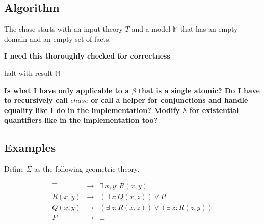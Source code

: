 	\subsection{Algorithm}
	\label{sec:chase.algorithm}

		The chase starts with an input theory $T$ and a model $\mathbb{M}$ that
		has an empty domain and an empty set of facts.

		\textbf{ I need this thoroughly checked for correctness }

		\begin{algorithm}[H]
		\DontPrintSemicolon
		halt with result $\mathbb{M}$ \;
		\end{algorithm}

		\textbf{Is what I have only applicable to a $\beta$ that is a single
		atomic? Do I have to recursively call $chase$ or call a helper for
		conjunctions and handle equality like I do in the implementation?
		Modify $\lambda$ for existential quantifiers like in the implementation
		too?}

	\subsection{Examples}

		Define $\Sigma$ as the following geometric theory.

		\begin{eqnarray}
			\label{eqn:chase1}
			\top    &  \to  &  \exists\ x,y : R(x,y)                             \\
			\label{eqn:chase2}
			R(x,y)  &  \to  &  (\exists\ z : Q(x,z)) \vee P                      \\
			\label{eqn:chase3}
			Q(x,y)  &  \to  &  (\exists\ z : R(x,z)) \vee (\exists\ z : R(z,y))  \\
			\label{eqn:chase4}
			P       &  \to  &  \bot
		\end{eqnarray}

